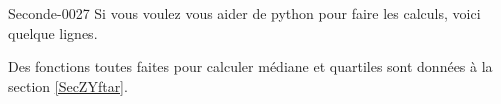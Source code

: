 \begin{corrige}{Seconde-0027}
    Si vous voulez vous aider de python pour faire les calculs, voici quelque lignes.

    

    Des fonctions toutes faites pour calculer médiane et quartiles sont données à la section \ref{SecZYftar}.



\end{corrige}
